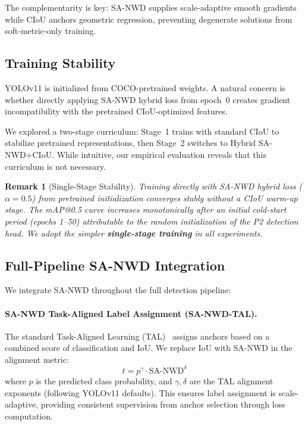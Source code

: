\documentclass[journal]{IEEEtran}
\newtheorem{remark}{Remark}
\begin{document}
The complementarity is key: SA-NWD supplies scale-adaptive smooth gradients while CIoU anchors geometric regression, preventing degenerate solutions from soft-metric-only training.

\subsection{Training Stability}

YOLOv11 is initialized from COCO-pretrained weights. A natural concern is whether directly applying SA-NWD hybrid loss from epoch~0 creates gradient incompatibility with the pretrained CIoU-optimized features.

We explored a two-stage curriculum: Stage~1 trains with standard CIoU to stabilize pretrained representations, then Stage~2 switches to Hybrid SA-NWD+CIoU. While intuitive, our empirical evaluation reveals that this curriculum is not necessary.

\begin{remark}[Single-Stage Stability]
\label{rem:single_stage}
Training directly with SA-NWD hybrid loss ($\alpha = 0.5$) from pretrained initialization converges stably without a CIoU warm-up stage. The mAP@0.5 curve increases monotonically after an initial cold-start period (epochs 1--50) attributable to the random initialization of the P2 detection head. We adopt the simpler \textbf{single-stage training} in all experiments.
\end{remark}

\subsection{Full-Pipeline SA-NWD Integration}

We integrate SA-NWD throughout the full detection pipeline:

\paragraph{SA-NWD Task-Aligned Label Assignment (SA-NWD-TAL).} The standard Task-Aligned Learning (TAL)~\cite{feng2021tood} assigns anchors based on a combined score of classification and IoU. We replace IoU with SA-NWD in the alignment metric:
\begin{equation}
  t = p^\gamma \cdot \text{SA-NWD}^\delta
\end{equation}
where $p$ is the predicted class probability, and $\gamma, \delta$ are the TAL alignment exponents (following YOLOv11 defaults). This ensures label assignment is scale-adaptive, providing consistent supervision from anchor selection through loss computation.
\end{document}
